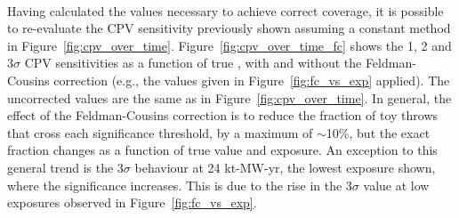\begin{figure*}[htbp]
  \centering
  \\
  \caption{Fraction of throws for which significance of DUNE's CP-violation test ($\deltacp \neq \{0,\pm\pi\}$) exceeds 1--3$\sigma$, calculated using constant-\dchisq (dashed lines) and \dchisqcrit values calculated using the Feldman-Cousins method (shaded histograms), as a function of the true value of \deltacp. Shown for NO, for a number of different exposures. The number of throws used to make each figure is also shown.}
  \label{fig:cpv_over_time_fc}
\end{figure*}
Having calculated the \dchisqcrit values necessary to achieve correct coverage, it is possible to re-evaluate the CPV sensitivity previously shown assuming a constant \dchisq method in Figure~\ref{fig:cpv_over_time}. Figure~\ref{fig:cpv_over_time_fc} shows the 1, 2 and 3$\sigma$ CPV sensitivities as a function of true \deltacp, with and without the Feldman-Cousins correction (e.g., the \dchisqcrit values given in Figure~\ref{fig:fc_vs_exp} applied). The uncorrected values are the same as in Figure~\ref{fig:cpv_over_time}. In general, the effect of the Feldman-Cousins correction is to reduce the fraction of toy throws that cross each significance threshold, by a maximum of $\sim$10\%, but the exact fraction changes as a function of true \deltacp value and exposure. An exception to this general trend is the 3$\sigma$ behaviour at 24 kt-MW-yr, the lowest exposure shown, where the significance increases. This is due to the rise in the 3$\sigma$ \dchisqcrit value at low exposures observed in Figure~\ref{fig:fc_vs_exp}.

